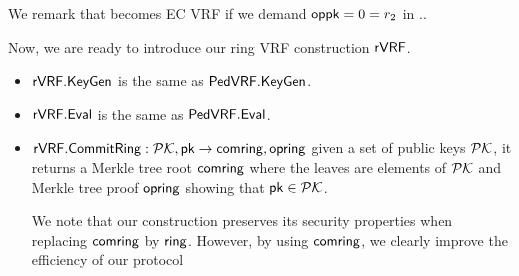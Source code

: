 \noindent We remark that \PedVRF becomes EC VRF if we demand $\mathsf{oppk} = 0 = r_2$ in \PedVRF.\Sign.


\smallskip

Now, we are ready to introduce our ring VRF construction  $ {\mathsf{rVRF}} $.

\begin{itemize}
	\item ${\mathsf{rVRF}}.{\mathsf{KeyGen}} $ is the same as $ {\mathsf{PedVRF}}.{\mathsf{KeyGen}}$.
	\item ${\mathsf{rVRF}}.{\mathsf{Eval}} $ is the same as $ {\mathsf{PedVRF}}.{\mathsf{Eval}}$.
	\item $ {\mathsf{rVRF}}.{\mathsf{CommitRing}}: {\mathcal{PK}}, \mathsf{pk} \rightarrow \mathsf{comring}, \mathsf{opring}$ given a set of public keys $ {\mathcal{PK}} $, it returns a Merkle tree root $ \mathsf{comring} $ where the leaves are elements of  $ {\mathcal{PK}}$ and Merkle tree proof $ \mathsf{opring} $ showing that $ \mathsf{pk} \in {\ensuremath{\mathcal{PK}}} $. 
	
	We note that our construction preserves its security properties when replacing $ \mathsf{comring} $
	by $ \mathsf{ring} $. However, by using $ \mathsf{comring} $, we clearly improve the efficiency of our protocol
	
\end{itemize}


